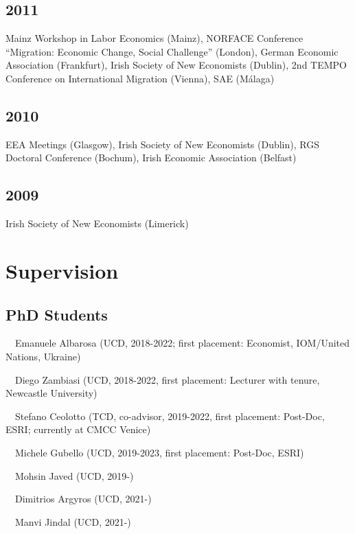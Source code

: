 \documentclass[10pt,a4paper,]{article}
\begin{document}
\hypertarget{section-24}{%
\subsection{2011}\label{section-24}}

Mainz Workshop in Labor Economics (Mainz), NORFACE Conference
``Migration: Economic Change, Social Challenge'' (London), German
Economic Association (Frankfurt), Irish Society of New Economists
(Dublin), 2nd TEMPO Conference on International Migration (Vienna), SAE
(Málaga)

\hypertarget{section-25}{%
\subsection{2010}\label{section-25}}

EEA Meetings (Glasgow), Irish Society of New Economists (Dublin), RGS
Doctoral Conference (Bochum), Irish Economic Association (Belfast)

\hypertarget{section-26}{%
\subsection{2009}\label{section-26}}

Irish Society of New Economists (Limerick)

\hypertarget{supervision}{%
\section{Supervision}\label{supervision}}

\hypertarget{phd-students}{%
\subsection{PhD Students}\label{phd-students}}

~~Emanuele Albarosa (UCD, 2018-2022; first placement: Economist,
IOM/United Nations, Ukraine)

~~Diego Zambiasi (UCD, 2018-2022, first placement: Lecturer with tenure,
Newcastle University)

~~Stefano Ceolotto (TCD, co-advisor, 2019-2022, first placement:
Post-Doc, ESRI; currently at CMCC Venice)

~~Michele Gubello (UCD, 2019-2023, first placement: Post-Doc, ESRI)

~~Mohsin Javed (UCD, 2019-)

~~Dimitrios Argyros (UCD, 2021-)

~~Manvi Jindal (UCD, 2021-)
\end{document}
